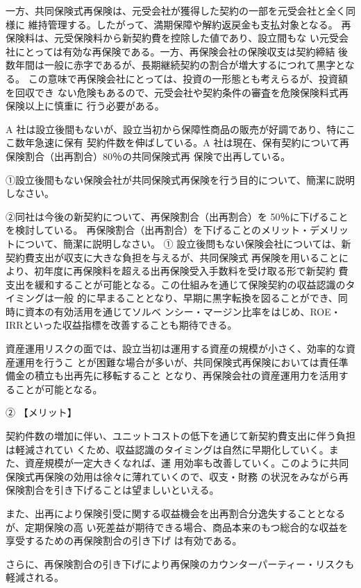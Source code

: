 \documentclass[report,gutter=10mm,fore-edge=10mm,uplatex,dvipdfmx]{jlreq}
\begin{document}
一方、共同保険式再保険は、元受会社が獲得した契約の一部を元受会社と全く同様に
維持管理する。したがって、満期保障や解約返戻金も支払対象となる。
再保険料は、元受保険料から新契約費を控除した値であり、設立間もな
い元受会社にとっては有効な再保険である。一方、再保険会社の保険収支は契約締結
後数年間は一般に赤字であるが、長期継続契約の割合が増大するにつれて黒字となる。
この意味で再保険会社にとっては、投資の一形態とも考えらるが、投資額を回収でき
ない危険もあるので、元受会社や契約条件の審査を危険保険料式再保険以上に慎重に
行う必要がある。

A 社は設立後間もないが、設立当初から保障性商品の販売が好調であり、特にここ数年急速に保有
契約件数を伸ばしている。A 社は現在、保有契約について再保険割合（出再割合）80％の共同保険式再
保険で出再している。

①設立後間もない保険会社が共同保険式再保険を行う目的について、簡潔に説明しなさい。

②同社は今後の新契約について、再保険割合（出再割合）を 50％に下げることを検討している。
再保険割合（出再割合）を下げることのメリット・デメリットについて、簡潔に説明しなさい。
\answer{}
\noindent ①
設立後問もない保険会社については、新契約費支出が収支に大きな負担を与えるが、共同保険式
再保険を用いることにより、初年度に再保険料を超える出再保険受入手数料を受け取る形で新契約
費支出を緩和することが可能となる。この仕組みを通じて保険契約の収益認識のタイミングは一般
的に早まることとなり、早期に黒字転換を図ることができ、同時に資本の有効活用を通じてソルベ
ンシー・マージン比率をはじめ、ROE・IRRといった収益指標を改善することも期待できる。

資産運用リスクの面では、設立当初は運用する資産の規模が小さく、効率的な資産運用を行うこ
とが困難な場合が多いが、共同保険式再保険においては責任準備金の積立も出再先に移転すること
となり、再保険会社の資産運用力を活用することが可能となる。

\noindent ②
\noindent 【メリット】

契約件数の増加に伴い、ユニットコストの低下を通じて新契約費支出に伴う負担は軽減されてい
くため、収益認識のタイミングは自然に早期化していく。また、資産規模が一定大きくなれば、運
用効率も改善していく。このように共同保険式再保険の効用は徐々に薄れていくので、収支・財務
の状況をみながら再保険割合を引き下げることは望ましいといえる。

また、出再により保険引受に関する収益機会を出再割合分逸失することとなるが、定期保険の高
い死差益が期待できる場合、商品本来のもつ総合的な収益を享受するための再保険割合の引き下げ
は有効である。

さらに、再保険割合の引き下げにより再保険のカウンターパーティー・リスクも軽減される。
\end{document}
